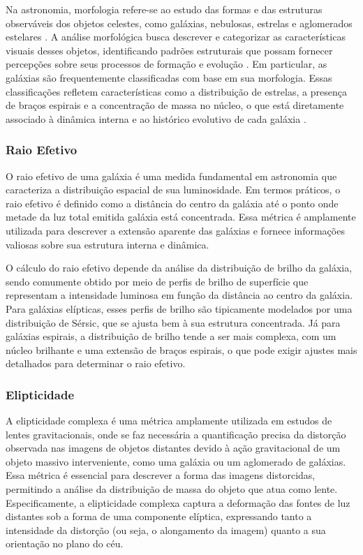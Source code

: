 Na astronomia, morfologia refere-se ao estudo das formas e das estruturas observáveis dos objetos celestes, como galáxias, nebulosas, estrelas e aglomerados estelares \cite{buta2011galaxy}. A análise morfológica busca descrever e categorizar as características visuais desses objetos, identificando padrões estruturais que possam fornecer percepções sobre seus processos de formação e evolução \cite{steinmetz2002galaxy}. Em particular, as galáxias são frequentemente classificadas com base em sua morfologia. Essas classificações refletem características como a distribuição de estrelas, a presença de braços espirais e a concentração de massa no núcleo, o que está diretamente associado à dinâmica interna e ao histórico evolutivo de cada galáxia \cite{van1998galaxy}.

\subsubsection{Raio Efetivo}
\label{sec:raio-efetivo}

O raio efetivo de uma galáxia é uma medida fundamental em astronomia que caracteriza a distribuição espacial de sua luminosidade. Em termos práticos, o raio efetivo é definido como a distância do centro da galáxia até o ponto onde metade da luz total emitida galáxia está concentrada. Essa métrica é amplamente utilizada para descrever a extensão aparente das galáxias e fornece informações valiosas sobre sua estrutura interna e dinâmica.

O cálculo do raio efetivo depende da análise da distribuição de brilho da galáxia, sendo comumente obtido por meio de perfis de brilho de superfície que representam a intensidade luminosa em função da distância ao centro da galáxia. Para galáxias elípticas, esses perfis de brilho são tipicamente modelados por uma distribuição de Sérsic, que se ajusta bem à sua estrutura concentrada. Já para galáxias espirais, a distribuição de brilho tende a ser mais complexa, com um núcleo brilhante e uma extensão de braços espirais, o que pode exigir ajustes mais detalhados para determinar o raio efetivo.

\subsubsection{Elipticidade}
\label{sec:elipticidade}

A elipticidade complexa é uma métrica amplamente utilizada em estudos de lentes gravitacionais, onde se faz necessária a quantificação precisa da distorção observada nas imagens de objetos distantes devido à ação gravitacional de um objeto massivo interveniente, como uma galáxia ou um aglomerado de galáxias. Essa métrica é essencial para descrever a forma das imagens distorcidas, permitindo a análise da distribuição de massa do objeto que atua como lente. Especificamente, a elipticidade complexa captura a deformação das fontes de luz distantes sob a forma de uma componente elíptica, expressando tanto a intensidade da distorção (ou seja, o alongamento da imagem) quanto a sua orientação no plano do céu.


